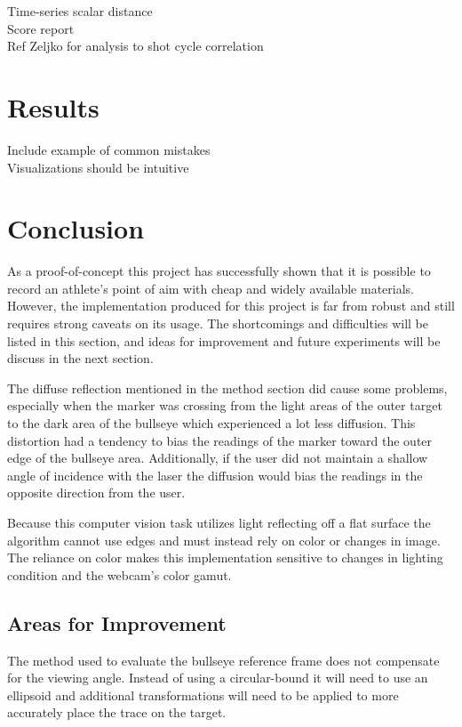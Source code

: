 \documentclass[conference]{IEEEtran}
\begin{document}
\textlangle Time-series scalar distance \textrangle \\
\textlangle Score report \textrangle \\
\textlangle Ref Zeljko for analysis to shot cycle correlation \textrangle

\section{Results}

\noindent
\textlangle Include example of common mistakes \textrangle \\
\textlangle Visualizations should be intuitive \textrangle

\section{Conclusion}

As a proof-of-concept this project has successfully shown that it is possible to record an athlete's point of aim with cheap and widely available materials.
However, the implementation produced for this project is far from robust and still requires strong caveats on its usage.
The shortcomings and difficulties will be listed in this section, 
and ideas for improvement and future experiments will be discuss in the next section.

The diffuse reflection mentioned in the method section did cause some problems, especially when the marker was crossing from the light areas of the outer target to the dark area of the bullseye which experienced a lot less diffusion.
This distortion had a tendency to bias the readings of the marker toward the outer edge of the bullseye area.
Additionally, if the user did not maintain a shallow angle of incidence with the laser the diffusion would bias the readings in the opposite direction from the user.

Because this computer vision task utilizes light reflecting off a flat surface the algorithm cannot use edges and must instead rely on color or changes in image.
The reliance on color makes this implementation sensitive to changes in lighting condition and the webcam's color gamut.

\subsection{Areas for Improvement}

The method used to evaluate the bullseye reference frame does not compensate for the viewing angle. Instead of using a circular-bound it will need to use an ellipsoid and additional transformations will need to be applied to more accurately place the trace on the target.
\end{document}
